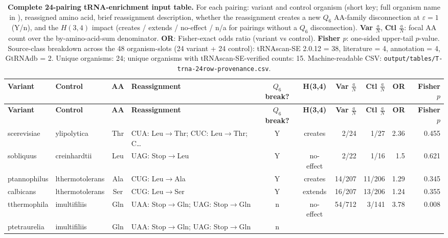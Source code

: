 \documentclass[preprint,11pt,authoryear,a4paper]{elsarticle}
\begin{document}
\begin{longtable}[]{@{}llclccrrrr@{}}
\caption{\textbf{Complete 24-pairing tRNA-enrichment input table.} For
each pairing: variant and control organism (short key; full organism
name in ), reassigned amino acid, brief reassignment
description, whether the reassignment creates a new \(Q_{6}\) AA-family
disconnection at \(\varepsilon = 1\) (Y/n), and the \(H(3,4)\) impact
(creates / extends / no-effect / n/a for pairings without a \(Q_{6}\)
disconnection). \textbf{Var \(\frac{a}{N}\)}, \textbf{Ctl
\(\frac{a}{N}\)}: focal AA count over the by-amino-acid-sum denominator.
\textbf{OR}: Fisher-exact odds ratio (variant vs control).
\textbf{Fisher \(p\)}: one-sided upper-tail \(p\)-value. Source-class
breakdown across the 48 organism-slots (24 variant + 24 control):
tRNAscan-SE 2.0.12 = 38, literature = 4, annotation = 4, GtRNAdb = 2.
Unique organisms: 24; unique organisms with tRNAscan-SE-verified counts:
15. Machine-readable CSV:
\texttt{output/tables/T-trna-24row-provenance.csv}.}\tabularnewline
\toprule\noalign{}
\textbf{Variant} & \textbf{Control} & \textbf{AA} &
\textbf{Reassignment} & \textbf{\(Q_{6}\) break?} & \textbf{H(3,4)} &
\textbf{Var \(\frac{a}{N}\)} & \textbf{Ctl \(\frac{a}{N}\)} &
\textbf{OR} & \textbf{Fisher \(p\)} \\
\midrule\noalign{}
\endfirsthead
\toprule\noalign{}
\textbf{Variant} & \textbf{Control} & \textbf{AA} &
\textbf{Reassignment} & \textbf{\(Q_{6}\) break?} & \textbf{H(3,4)} &
\textbf{Var \(\frac{a}{N}\)} & \textbf{Ctl \(\frac{a}{N}\)} &
\textbf{OR} & \textbf{Fisher \(p\)} \\
\midrule\noalign{}
\endhead
\bottomrule\noalign{}
\endlastfoot
scerevisiae & ylipolytica & Thr & CUA: Leu\ensuremath{\to}{}Thr; CUC: Leu\ensuremath{\to}{}Thr; C\ldots{}
& Y & creates & 2/24 & 1/27 & 2.36 & 0.455 \\
sobliquus & creinhardtii & Leu & UAG: Stop\ensuremath{\to}{}Leu & Y & no-effect & 2/22 &
1/16 & 1.5 & 0.621 \\
ptannophilus & lthermotolerans & Ala & CUG: Leu\ensuremath{\to}{}Ala & Y & creates &
14/207 & 11/206 & 1.29 & 0.345 \\
calbicans & lthermotolerans & Ser & CUG: Leu\ensuremath{\to}{}Ser & Y & extends & 16/207
& 13/206 & 1.24 & 0.355 \\
tthermophila & imultifiliis & Gln & UAA: Stop\ensuremath{\to}{}Gln; UAG: Stop\ensuremath{\to}{}Gln & n &
no-effect & 54/712 & 3/141 & 3.78 & 0.008 \\
ptetraurelia & imultifiliis & Gln & UAA: Stop\ensuremath{\to}{}Gln; UAG: Stop\ensuremath{\to}{}Gln & n &

\end{longtable}
\end{document}
